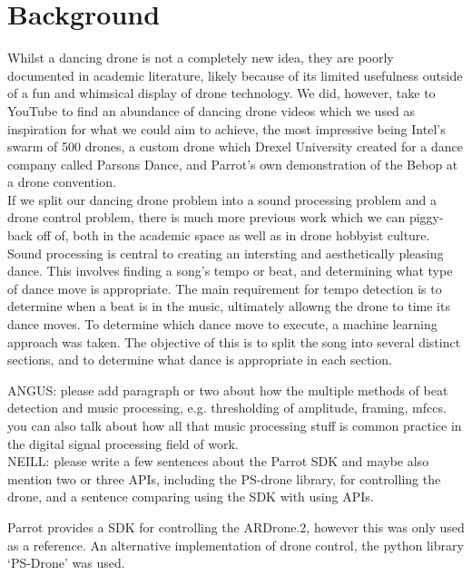 \section{Background}

Whilst a dancing drone is not a completely new idea, they are poorly documented in academic literature, likely because of its limited usefulness outside of a fun and whimsical display of drone technology. We did, however, take to YouTube to find an abundance of dancing drone videos which we used as inspiration for what we could aim to achieve, the most impressive being Intel's swarm of 500 drones, a custom drone which Drexel University created for a dance company called Parsons Dance, and Parrot's own demonstration of the Bebop at a drone convention.\\


If we split our dancing drone problem into a sound processing problem and a drone control problem, there is much more previous work which we can piggy-back off of, both in the academic space as well as in drone hobbyist culture.\\

Sound processing is central to creating an intersting and aesthetically pleasing dance. This involves finding a song's tempo or beat, and determining what type of dance move is appropriate. The main requirement for tempo detection is to determine when a beat is in the music, ultimately allowng the drone to time its dance moves. To determine which dance move to execute, a machine learning approach was taken. The objective of this is to split the song into several distinct sections, and to determine what dance is appropriate in each section. 

ANGUS: please add paragraph or two about how the multiple methods of beat detection and music processing, e.g. thresholding of amplitude, framing, mfccs. you can also talk about how all that music processing stuff is common practice in the digital signal processing field of work.\\

NEILL: please write a few sentences about the Parrot SDK and maybe also mention two or three APIs, including the PS-drone library, for controlling the drone, and a sentence comparing using the SDK with using APIs.

Parrot provides a SDK for controlling the ARDrone.2, however this was only used as a reference. An alternative
implementation of drone control, the python library `PS-Drone' was used.
